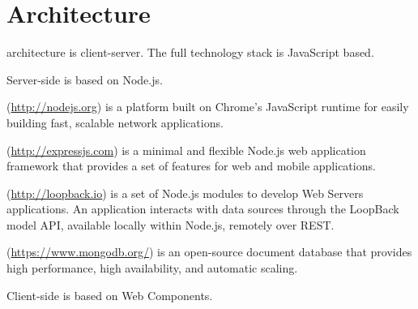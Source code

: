 \section{Architecture}
 architecture is client-server.
The full technology stack is JavaScript based.

Server-side is based on Node.js.

\begin{description}
\itemsep1pt\parskip0pt
        \item[Node.js] (\url{http://nodejs.org}) is a platform built on Chrome's JavaScript runtime for easily building fast, scalable network applications.
        \item[Express.js] (\url{http://expressjs.com}) is a minimal and flexible Node.js web application framework that provides a set of features for web and mobile applications.
        \item[Loopback] (\url{http://loopback.io}) is a set of Node.js modules to develop Web Servers applications. An application interacts with data sources through the LoopBack model API, available locally within Node.js, remotely over REST.
        \item[MongoDB] (\url{https://www.mongodb.org/}) is an open-source document database that provides high performance, high availability, and automatic scaling.
\end{description}


Client-side is based on Web Components.

